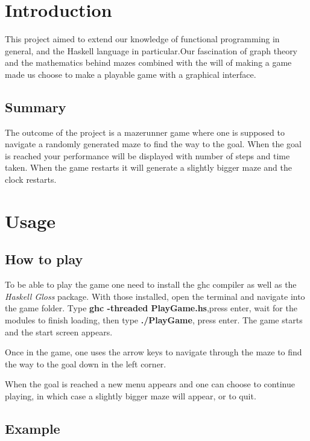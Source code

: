 \documentclass[12pt, a4paper]{article}
\begin{document}
\maketitle
\newpage


\tableofcontents


\newpage
\section{Introduction}
This project aimed to extend our knowledge of functional programming in general, and the Haskell language in particular.Our fascination of graph theory and the mathematics behind mazes combined with the will of making a game made us choose to make a playable game with a graphical interface.


\subsection{Summary}
The outcome of the project is a mazerunner game where one is supposed to navigate a randomly generated maze to find the way to the goal. When the goal is reached your performance will be displayed with number of steps and time taken. When the game restarts it will generate a slightly bigger maze and the clock restarts.


\section{Usage}
\subsection{How to play}
To be able to play the game one need to install the ghc compiler as well as the \textit{Haskell Gloss} package. With those installed, open the terminal and navigate into the game folder. Type \textbf{ghc -threaded PlayGame.hs},press enter, wait for the modules to finish loading, then type \textbf{./PlayGame}, press enter. The game starts and the start screen appears.


Once in the game, one uses the arrow keys to navigate through the maze to find the way to the goal down in the left corner. 

When the goal is reached a new menu appears and one can choose to continue playing, in which case a slightly bigger maze will appear, or to quit.


\subsection{Example}
\end{document}
